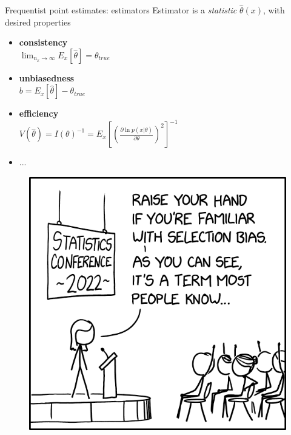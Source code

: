 \documentclass[
aspectratio=169,
14pt,
professionalfonts
]{beamer}
\begin{document}
\begin{frame}{Frequentist point estimates: estimators}
    Estimator is a \textit{statistic} $\hat \theta(x)$, with desired properties
    \begin{minipage}{0.65\textwidth}
        \begin{itemize}
            \item \textbf{consistency}\\
            $\lim_{n_x \to \infty} E_x[\hat \theta] = \theta_{true}$
            \item \textbf{unbiasedness}\\
            $b = E_x[\hat \theta] - \theta_{true}$
            
            \item \textbf{efficiency}\\
            $V(\hat \theta) = I(\theta)^{-1} = E_x\left[\left(\frac{\partial \ln p(x|\theta)}{\partial \theta}\right)^2\right]^{-1}$
            \item ...
        \end{itemize}
    \end{minipage}
    \begin{minipage}{0.34\textwidth}
        \begin{figure}
            \centering
            \includegraphics[width=\linewidth]{../plots/selection_bias_2x.png}
        \end{figure}
    \end{minipage}
\end{frame}
\end{document}
